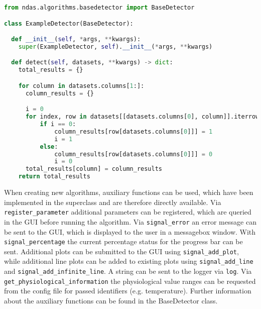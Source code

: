 \begin{lstlisting}[language=python,caption=example.py: Minimal example for an implemented algorithm.]
from ndas.algorithms.basedetector import BaseDetector

class ExampleDetector(BaseDetector):

  def __init__(self, *args, **kwargs):
    super(ExampleDetector, self).__init__(*args, **kwargs)

  def detect(self, datasets, **kwargs) -> dict:
    total_results = {}

    for column in datasets.columns[1:]:
      column_results = {}

      i = 0
      for index, row in datasets[[datasets.columns[0], column]].iterrows():
          if i == 0:
              column_results[row[datasets.columns[0]]] = 1
              i = 1
          else:
              column_results[row[datasets.columns[0]]] = 0
              i = 0
      total_results[column] = column_results
    return total_results
  \end{lstlisting}
 When creating new algorithms, auxiliary functions can be used, which have been implemented in the superclass and are therefore directly available. Via \texttt{register\_parameter} additional parameters can be registered, which are queried in the GUI before running the algorithm. Via \texttt{signal\_error} an error message can be sent to the GUI, which is displayed to the user in a messagebox window. With \texttt{signal\_percentage} the current percentage status for the progress bar can be sent. Additional plots can be submitted to the GUI using \texttt{signal\_add\_plot}, while additional line plots can be added to existing plots using \texttt{signal\_add\_line} and \texttt{signal\_add\_infinite\_line}. A string can be sent to the logger via \texttt{log}. Via \texttt{get\_physiological\_information} the physiological value ranges can be requested from the config file for passed identifiers (e.g. temperature). Further information about the auxiliary functions can be found in the BaseDetector class.